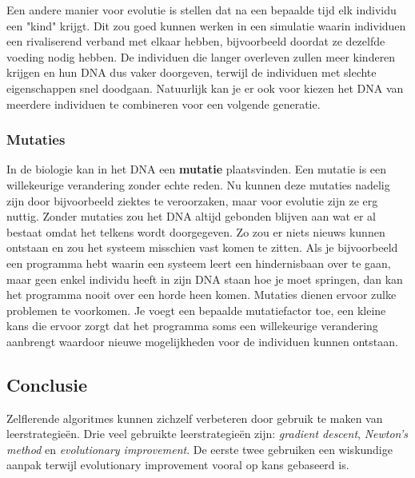 Een andere manier voor evolutie is stellen dat na een bepaalde tijd elk individu een "kind" krijgt. Dit zou goed kunnen werken in een simulatie waarin individuen een rivaliserend verband met elkaar hebben, bijvoorbeeld doordat ze dezelfde voeding nodig hebben. De individuen die langer overleven zullen meer kinderen krijgen en hun DNA dus vaker doorgeven, terwijl de individuen met slechte eigenschappen snel doodgaan. Natuurlijk kan je er ook voor kiezen het DNA van meerdere individuen te combineren voor een volgende generatie.

\subsubsection{Mutaties}
In de biologie kan in het DNA een \textbf{mutatie} plaatsvinden. Een mutatie is een willekeurige verandering zonder echte reden. Nu kunnen deze mutaties nadelig zijn door bijvoorbeeld ziektes te veroorzaken, maar voor evolutie zijn ze erg nuttig. Zonder mutaties zou het DNA altijd gebonden blijven aan wat er al bestaat omdat het telkens wordt doorgegeven. Zo zou er niets nieuws kunnen ontstaan en zou het systeem misschien vast komen te zitten. Als je bijvoorbeeld een programma hebt waarin een systeem leert een hindernisbaan over te gaan, maar geen enkel individu heeft in zijn DNA staan hoe je moet springen, dan kan het programma nooit over een horde heen komen. Mutaties dienen ervoor zulke problemen te voorkomen. Je voegt een bepaalde mutatiefactor toe, een kleine kans die ervoor zorgt dat het programma soms een willekeurige verandering aanbrengt waardoor nieuwe mogelijkheden voor de individuen kunnen ontstaan.

\subsection{Conclusie}
Zelflerende algoritmes kunnen zichzelf verbeteren door gebruik te maken van leerstrategie\"en. Drie veel gebruikte leerstrategie\"en zijn: \textit{gradient descent}, \textit{Newton's method} en \textit{evolutionary improvement}. De eerste twee gebruiken een wiskundige aanpak terwijl evolutionary improvement vooral op kans gebaseerd is.